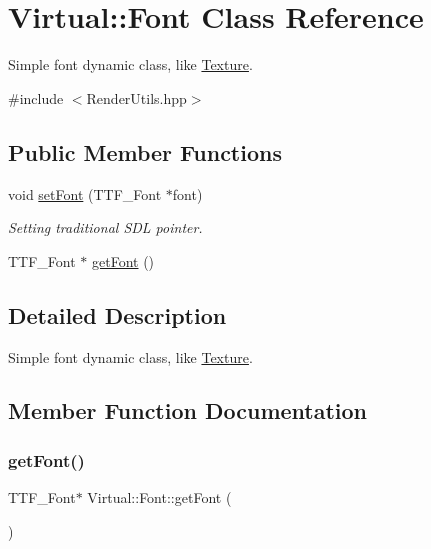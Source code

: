 \hypertarget{class_virtual_1_1_font}{}\section{Virtual\+:\+:Font Class Reference}
\label{class_virtual_1_1_font}


Simple font dynamic class, like \hyperlink{class_virtual_1_1_texture}{Texture}.  




{\ttfamily \#include $<$Render\+Utils.\+hpp$>$}

\subsection*{Public Member Functions}
\begin{DoxyCompactItemize}
\item 
void \hyperlink{class_virtual_1_1_font_ad0ca95bbe50987aedb3b6efa53ec252b}{set\+Font} (T\+T\+F\+\_\+\+Font $\ast$font)
\begin{DoxyCompactList}\small\item\em Setting traditional S\+DL pointer. \end{DoxyCompactList}\item 
T\+T\+F\+\_\+\+Font $\ast$ \hyperlink{class_virtual_1_1_font_a4771650afab7d6a292a439b29eaef81f}{get\+Font} ()
\end{DoxyCompactItemize}


\subsection{Detailed Description}
Simple font dynamic class, like \hyperlink{class_virtual_1_1_texture}{Texture}. 

\subsection{Member Function Documentation}
\hypertarget{class_virtual_1_1_font_a4771650afab7d6a292a439b29eaef81f}{}\label{class_virtual_1_1_font_a4771650afab7d6a292a439b29eaef81f} 
\subsubsection{\texorpdfstring{get\+Font()}{getFont()}}
{\footnotesize\ttfamily T\+T\+F\+\_\+\+Font$\ast$ Virtual\+::\+Font\+::get\+Font (\begin{DoxyParamCaption}{ }\end{DoxyParamCaption})}

